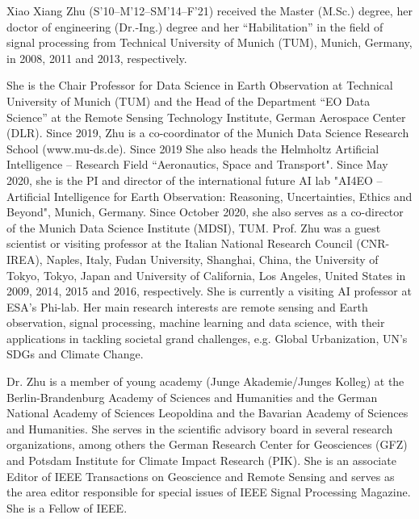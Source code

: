 \documentclass[lettersize,journal]{IEEEtran}
\begin{document}
\begin{IEEEbiographynophoto}{Xiao Xiang Zhu} (S'10--M'12--SM'14--F'21) received the Master (M.Sc.) degree, her doctor of engineering (Dr.-Ing.) degree and her “Habilitation” in the field of signal processing from Technical University of Munich (TUM), Munich, Germany, in 2008, 2011 and 2013, respectively.
\par
She is the Chair Professor for Data Science in Earth Observation at Technical University of Munich (TUM) and the Head of the Department ``EO Data Science'' at the Remote Sensing Technology Institute, German Aerospace Center (DLR). Since 2019, Zhu is a co-coordinator of the Munich Data Science Research School (www.mu-ds.de). Since 2019 She also heads the Helmholtz Artificial Intelligence -- Research Field ``Aeronautics, Space and Transport". Since May 2020, she is the PI and director of the international future AI lab "AI4EO -- Artificial Intelligence for Earth Observation: Reasoning, Uncertainties, Ethics and Beyond", Munich, Germany. Since October 2020, she also serves as a co-director of the Munich Data Science Institute (MDSI), TUM. Prof. Zhu was a guest scientist or visiting professor at the Italian National Research Council (CNR-IREA), Naples, Italy, Fudan University, Shanghai, China, the University  of Tokyo, Tokyo, Japan and University of California, Los Angeles, United States in 2009, 2014, 2015 and 2016, respectively. She is currently a visiting AI professor at ESA's Phi-lab. Her main research interests are remote sensing and Earth observation, signal processing, machine learning and data science, with their applications in tackling societal grand challenges, e.g. Global Urbanization, UN’s SDGs and Climate Change.

Dr. Zhu is a member of young academy (Junge Akademie/Junges Kolleg) at the Berlin-Brandenburg Academy of Sciences and Humanities and the German National  Academy of Sciences Leopoldina and the Bavarian Academy of Sciences and Humanities. She serves in the scientific advisory board in several research organizations, among others the German Research Center for Geosciences (GFZ) and Potsdam Institute for Climate Impact Research (PIK). She is an associate Editor of IEEE Transactions on Geoscience and Remote Sensing and serves as the area editor responsible for special issues of IEEE Signal Processing Magazine. She is a Fellow of IEEE.
\end{IEEEbiographynophoto}
\end{document}
